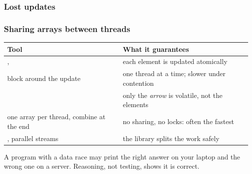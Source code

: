 \documentclass[aspectratio=169,10pt,compress]{beamer}
\begin{document}




\begin{frame}[t,fragile] \frametitle{Lost updates}

	\footnotesize {}
\end{frame}




\begin{frame}[t,fragile] \frametitle{Sharing arrays between threads}


\begin{table}
		\footnotesize
		\begin{tabular}{@{}L{0.32\textwidth}L{0.60\textwidth}@{}}
			\toprule
			\textbf{Tool} & \textbf{What it guarantees} \\
			\midrule
			,  & each element is updated atomically \\
			 block around the update        & one thread at a time; slower under contention \\
			                            & only the \emph{arrow} is volatile, not the elements \\
			one array per thread, combine at the end            & no sharing, no locks: often the fastest \\
			, parallel streams       & the library splits the work safely \\
			\bottomrule
		\end{tabular}
\end{table}%


	\vspace{0.3em}
	\small A program with a data race may print the right answer on your laptop and the wrong one on a server.
	Reasoning, not testing, shows it is correct.
\end{frame}
\end{document}
